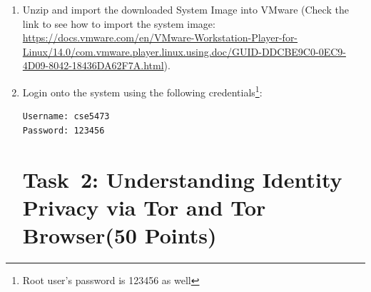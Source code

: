 \documentclass[11pt]{article}
\newcommand{\tor}{{\sf Tor}\xspace}
\newcommand{\torbw}{{\sf Tor Browser}\xspace}
\begin{document}
\begin{enumerate}
\begin{itemize}
\item \textbf{Install \textsf{Crackle}}: \textsf{Crackle} is a Bluetooth hacking tool which works against Bluetooth legacy (i.e., Bluetooth 4.0 and Bluetooth 4.1). It allows an attacker to brute force the TK (Temporary Key) and decrypt the encrypted Bluetooth packets.
\begin{itemize}
\item Download \textsf{Crackle} at \url{http://lacklustre.net/projects/crackle/crackle-0.1.tgz}.
\item Unzip \textsf{Crackle}.
 \begin{lstlisting}
tar -zxvf crackle-0.1.tgz
\end{lstlisting}\vspace{-6mm}
\item Install dependency using the following commands.
 \begin{lstlisting}
$ sudo apt-get install libpcap0.8-dev
\end{lstlisting}\vspace{-6mm}
\item Go to the directory of \textsf{Crackle} and type: 
 \begin{lstlisting}
$ make 
$ make install
\end{lstlisting}\vspace{-6mm}
\end{itemize}




\end{itemize}


 
 
\item Unzip and import the downloaded System Image into VMware (Check the link to see how to import the system image:  \url{https://docs.vmware.com/en/VMware-Workstation-Player-for-Linux/14.0/com.vmware.player.linux.using.doc/GUID-DDCBE9C0-0EC9-4D09-8042-18436DA62F7A.html}).

\item Login onto the system using the following credentials\footnote{Root user's password is 123456 as well}: 
 \begin{lstlisting}
Username: cse5473
Password: 123456
\end{lstlisting}\vspace{-6mm}


\section{Task~2: Understanding Identity Privacy via \tor and \torbw (50 Points)} 


\end{enumerate}
\end{document}

